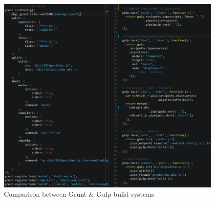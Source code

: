 	\begin{figure}[ht]
		\label{fig_grunt_gulp}
		\centering
		\hspace*{-1.4cm}
		\includegraphics[width=1.2\textwidth]{figures/grunt_gulp_comparison}
		\caption{Comparison between Grunt \& Gulp build systems}
	\end{figure}
	


